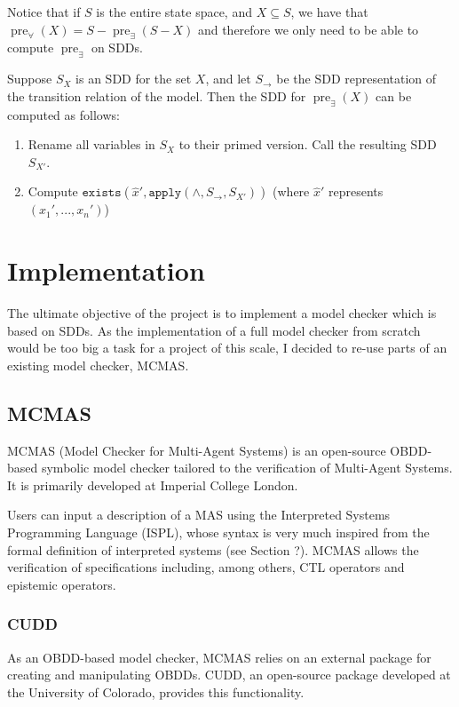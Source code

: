 \documentclass{article}
\newcommand{\pre}{\mathop{\mathrm{pre}}}
\begin{document}
Notice that if $S$ is the entire state space, and $X \subseteq S$, we have that $\pre_{\forall}(X) = S - \pre_{\exists}(S - X)$ and therefore we only need to be able to compute $\pre_{\exists}$ on SDDs.

Suppose $S_X$ is an SDD for the set $X$, and let $S_{\rightarrow}$ be the SDD representation of the transition relation of the model. 
Then the SDD for $\pre_{\exists}(X)$  can be computed as follows: 
\begin{enumerate} 
\item Rename all variables in $S_X$ to their primed version. Call the resulting SDD $S_{X'}$.
\item Compute $\texttt{exists}(\hat{x}', \texttt{apply}(\land, S_{\rightarrow},  S_{X'}) )$ (where $\hat{x}'$ represents $(x_1', ..., x_n ')$)
\end{enumerate}



\section{Implementation}

The ultimate objective of the project is to implement a model checker which is based on SDDs. As the implementation of a full model checker from scratch would be too big a task for a project of this scale, I decided to re-use parts of an existing model checker, MCMAS. 

\subsection{MCMAS}
 
MCMAS (Model Checker for Multi-Agent Systems) is an open-source OBDD-based symbolic model checker tailored to the verification of Multi-Agent Systems. \cite{MCMAS_website} It is primarily developed at Imperial College London.

Users can input a description of a MAS using the Interpreted Systems Programming Language (ISPL), whose syntax is very much inspired from the formal definition of interpreted systems (see Section ?). MCMAS allows the verification of specifications including, among others, CTL operators and epistemic operators.

\subsubsection{CUDD}

As an OBDD-based model checker, MCMAS relies on an external package for creating and manipulating OBDDs. 
CUDD, an open-source package developed at the University of Colorado, provides this functionality. \cite{CUDD_website}
\end{document}
